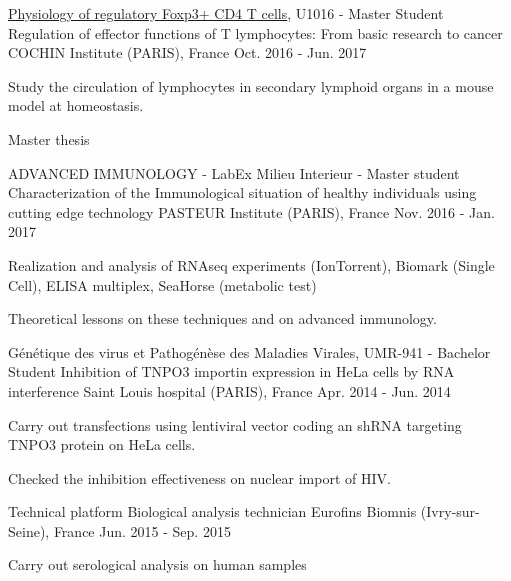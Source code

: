 \begin{cventries}
  \cventry
    {\href{https://www.institutcochin.fr/departments/3i/team-lucas/physiology-of-regulatory-foxp3-cd4-t-cells}{Physiology of regulatory Foxp3+ CD4 T cells}, U1016 - Master Student}%
    {Regulation of effector functions of T lymphocytes: From basic research to cancer} %
    {COCHIN Institute (PARIS), France} %
    {Oct. 2016 - Jun. 2017} %
    {
      \begin{cvitems} %
        \item {Study the circulation of lymphocytes in secondary lymphoid organs in a mouse model at homeostasis.}
        \item {Master thesis}
      \end{cvitems}
    }

  \cventry
    {ADVANCED IMMUNOLOGY - LabEx Milieu Interieur - Master student} %
    {Characterization of the Immunological situation of healthy individuals using cutting edge technology} %
    {PASTEUR Institute (PARIS), France} %
    {Nov. 2016 - Jan. 2017} %
    {
      \begin{cvitems} %
        \item {Realization and analysis of RNAseq experiments (IonTorrent), Biomark (Single Cell), ELISA multiplex, SeaHorse (metabolic test)}
        \item {Theoretical lessons on these techniques and on advanced immunology.}
      \end{cvitems}
    }

  \cventry
    {Génétique des virus et Pathogénèse des Maladies Virales, UMR-941 - Bachelor Student} %
    {Inhibition of TNPO3 importin expression in HeLa cells by RNA interference} %
    {Saint Louis hospital (PARIS), France} %
    {Apr. 2014 - Jun. 2014} %
    {
      \begin{cvitems} %
        \item {Carry out transfections using lentiviral vector coding an shRNA targeting TNPO3 protein on HeLa cells.}
        \item {Checked the inhibition effectiveness on nuclear import of HIV.}
      \end{cvitems}
    }

  \cventry
    {Technical platform} %
    {Biological analysis technician} %
    {Eurofins Biomnis (Ivry-sur-Seine), France} %
    {Jun. 2015 - Sep. 2015} %
    {
      \begin{cvitems} %
        \item {Carry out serological analysis on human samples}
      \end{cvitems}
    }
    
\end{cventries}
